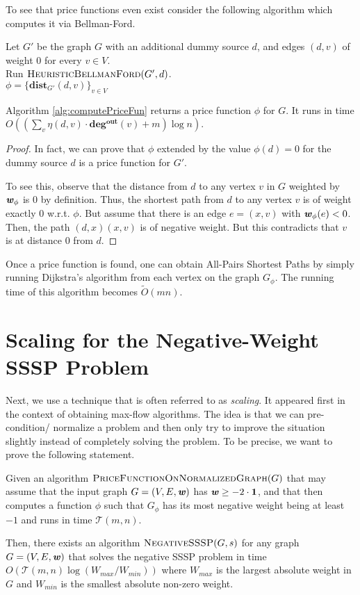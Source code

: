 To see that price functions even exist consider the following algorithm which computes it via Bellman-Ford.

\begin{algorithm}
Let $G'$ be the graph $G$ with an additional dummy source $d$, and edges $(d,v)$ of weight $0$ for every $v \in V$. \\
Run $\textsc{HeuristicBellmanFord}(G',d)$.\\
\Return $\phi =\{ \mathbf{dist}_{G'}(d,v)\}_{v \in V}$
\caption{$\textsc{ComputePriceFunction}(G)$}
\label{alg:computePriceFun}
\end{algorithm}

\begin{claim}
Algorithm \ref{alg:computePriceFun} returns a price function $\phi$ for $G$.  It runs in time $O((\sum_v \eta(d,v) \cdot \mathbf{deg^{out}}(v) + m) \log n)$. 
\end{claim}
\begin{proof}
In fact, we can prove that $\phi$ extended by the value $\phi(d) = 0$ for the dummy source $d$ is a price function for $G'$. 

To see this, observe that the distance from $d$ to any vertex $v$ in $G$ weighted by $\boldsymbol{\mathit{w}}_{\phi}$ is $0$ by definition. Thus, the shortest path from $d$ to any vertex $v$ is of weight exactly $0$ w.r.t. $\phi$. But assume that there is an edge $e = (x, v)$ with $\boldsymbol{\mathit{w}}_{\phi}(e) < 0$. Then, the path $(d,x)(x,v)$ is of negative weight. But this contradicts that $v$ is at distance $0$ from $d$.
\end{proof}

Once a price function is found, one can obtain All-Pairs Shortest Paths by simply running Dijkstra's algorithm from each vertex on the graph $G_{\phi}$.  The running time of this algorithm becomes $\tilde{O}(mn)$. 

\section{Scaling for the Negative-Weight SSSP Problem}

Next, we use a technique that is often referred to as \emph{scaling}. It appeared first in the context of obtaining max-flow algorithms. The idea is that we can pre-condition/ normalize a problem and then only try to improve the situation slightly instead of completely solving the problem. To be precise, we want to prove the following statement.

\begin{theorem}\label{thm:reduceToNormalized}
Given an algorithm $\textsc{PriceFunctionOnNormalizedGraph}(G)$ that may assume that the input graph $G=(V,E,\boldsymbol{\mathit{w}})$ has $\boldsymbol{\mathit{w}} \geq -2 \cdot \boldsymbol{1}$, and that then computes a function $\phi$ such that $G_{\phi}$ has its most negative weight being at least $-1$ and runs in time $\mathcal{T}(m, n)$. 

Then, there exists an algorithm $\textsc{NegativeSSSP}(G,s)$ for any graph $G=(V,E, \boldsymbol{\mathit{w}})$ that solves the negative SSSP problem in time $O(\mathcal{T}(m, n) \log(W_{max}/W_{min}))$ where $W_{max}$ is the largest absolute weight in $G$ and $W_{min}$ is the smallest absolute non-zero weight.
\end{theorem}


